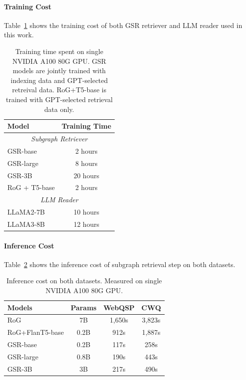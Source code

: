 \documentclass[11pt]{article}
\begin{document}
\paragraph{Training Cost}
Table~\ref{tab:training_cost} shows the training cost of both GSR retriever and LLM reader used in this work.
\begin{table}[t]
    \centering
    \begin{tabular}{l|c}
    \toprule
        \textbf{Model} & \textbf{Training Time} \\ \midrule
        \multicolumn{2}{c}{\textit{Subgraph Retriever}} \\ \midrule
        GSR-base & 2 hours \\ 
        GSR-large & 8 hours \\ 
        GSR-3B & 20 hours \\ \midrule
        RoG + T5-base & 2 hours \\
        \midrule
        \multicolumn{2}{c}{\textit{LLM Reader}} \\ \midrule
        LLaMA2-7B & 10 hours\\
        LLaMA3-8B & 12 hours\\
        \bottomrule
    \end{tabular}
    \caption{Training time spent on single NVIDIA A100 80G GPU. GSR models are jointly trained with indexing data and GPT-selected retreival data. RoG+T5-base is trained with GPT-selected retrieval data only.}
    \label{tab:training_cost}
\end{table}
\paragraph{Inference Cost}
Table~\ref{tab:inference_cost} shows the inference cost of subgraph retrieval step on both datasets. 
\begin{table}[t]
    \centering
    \small
    \begin{tabular}{l|c|cc}
    \toprule
        Models & Params & WebQSP & CWQ \\ \midrule
        RoG & 7B & 1,650s & 3,823s\\ \midrule
        RoG+FlanT5-base & 0.2B & 912s & 1,887s \\ \midrule
        GSR-base & 0.2B & 117s & 258s \\
        GSR-large & 0.8B & 190s & 443s \\
        GSR-3B & 3B & 217s & 490s \\
    \bottomrule
    \end{tabular}
    \caption{Inference cost on both datasets. Measured on single NVIDIA A100 80G GPU.}
    \label{tab:inference_cost}
\end{table}
\end{document}
